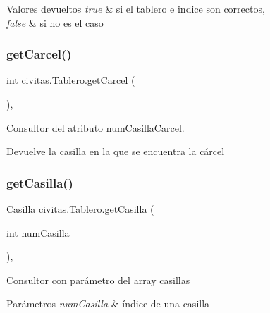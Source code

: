 \begin{DoxyRetVals}{Valores devueltos}
{\em true} & si el tablero e indice son correctos, \\
\hline
{\em false} & si no es el caso \\
\hline
\end{DoxyRetVals}
\mbox{\label{classcivitas_1_1Tablero_a82417628c739720b0528cd70165fb0c1}} 
\subsubsection{\texorpdfstring{get\+Carcel()}{getCarcel()}}
{\footnotesize\ttfamily int civitas.\+Tablero.\+get\+Carcel (\begin{DoxyParamCaption}{ }\end{DoxyParamCaption})\hspace{0.3cm}{\ttfamily [inline]}, {\ttfamily [package]}}

Consultor del atributo num\+Casilla\+Carcel. \begin{DoxyReturn}{Devuelve}
la casilla en la que se encuentra la cárcel 
\end{DoxyReturn}
\mbox{\label{classcivitas_1_1Tablero_a3e8d442ecab08ad5735bb82ed191cebb}} 
\subsubsection{\texorpdfstring{get\+Casilla()}{getCasilla()}}
{\footnotesize\ttfamily \hyperlink{classcivitas_1_1Casilla}{Casilla} civitas.\+Tablero.\+get\+Casilla (\begin{DoxyParamCaption}\item[{int}]{num\+Casilla }\end{DoxyParamCaption})\hspace{0.3cm}{\ttfamily [inline]}, {\ttfamily [package]}}

Consultor con parámetro del array casillas 
\begin{DoxyParams}{Parámetros}
{\em num\+Casilla} & índice de una casilla \\
\hline
\end{DoxyParams}
\mbox{\label{classcivitas_1_1Tablero_a9df67a69c40715a9ddee0341fd1aeaff}} 
